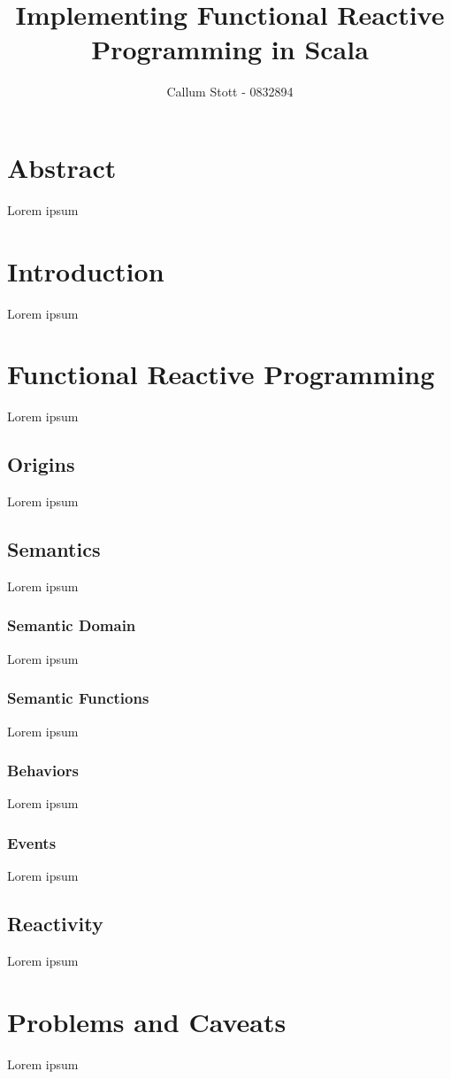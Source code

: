 \documentclass{article}
\title{Implementing Functional Reactive Programming in Scala}
\author{Callum Stott - 0832894}
\begin{document}
  \maketitle
  
  \newpage
  \tableofcontents
  
  \newpage
  
  \section*{Abstract}
  Lorem ipsum
  \section{Introduction}
  Lorem ipsum
  \section{Functional Reactive Programming}
  Lorem ipsum
    \subsection{Origins}
    Lorem ipsum
    \subsection{Semantics}
    Lorem ipsum
      \subsubsection{Semantic Domain}
      Lorem ipsum
      \subsubsection{Semantic Functions}
      Lorem ipsum
      \subsubsection{Behaviors}
      Lorem ipsum
      \subsubsection{Events}
      Lorem ipsum
    \subsection{Reactivity}
    Lorem ipsum
  \section{Problems and Caveats}
    Lorem ipsum
\end{document}
